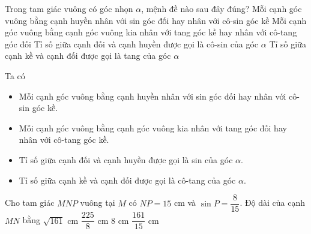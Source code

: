 \begin{bt}%
	Trong tam giác vuông có góc nhọn $\alpha$, mệnh đề nào sau đây đúng?
	\choice
	{\True Mỗi cạnh góc vuông bằng cạnh huyền nhân với sin góc đối hay nhân với cô-sin góc kề}
	{Mỗi cạnh góc vuông bằng cạnh góc vuông kia nhân với tang góc kề hay nhân với cô-tang góc đối}
	{Tỉ số giữa cạnh đối và cạnh huyền được gọi là cô-sin của góc $\alpha$}
	{Tỉ số giữa cạnh kề và cạnh đối được gọi là tang của góc $\alpha$}
	\loigiai
	{
		Ta có
		\begin{itemize}
			\item Mỗi cạnh góc vuông bằng cạnh huyền nhân với sin góc đối hay nhân với cô-sin góc kề.
			\item Mỗi cạnh góc vuông bằng cạnh góc vuông kia nhân với tang góc đối hay nhân với cô-tang góc kề.
			\item Tỉ số giữa cạnh đối và cạnh huyền được gọi là sin của góc $\alpha$.
			\item Tỉ số giữa cạnh kề và cạnh đối được gọi là cô-tang của góc $\alpha$.
		\end{itemize}
	}
\end{bt}

\begin{bt}%
	Cho tam giác $MNP$ vuông tại $M$ có $NP=15$ cm và $\sin P = \dfrac{8}{15}$. Độ dài của cạnh $MN$ bằng
	\choice
	{$\sqrt{161}$ cm}
	{$\dfrac{225}{8}$ cm}
	{\True $8$ cm}
	{$\dfrac{161}{15}$ cm}
	\loigiai
	{
		{
		}
	}
\end{bt}

